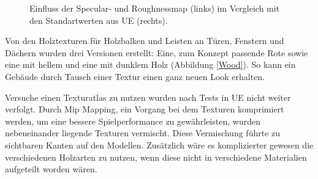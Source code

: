 \begin{figure}[H]
\centering
  \caption{Einfluss der Specular- und Roughnessmap (links) im Vergleich mit den Standartwerten aus UE (rechts).}
	\label{specroughvs}
\end{figure}
\vspace{-10.5pt}
Von den Holztexturen für Holzbalken und Leisten an Türen, Fenstern und Dächern wurden drei Versionen erstellt: Eine, zum Konzept passende Rote sowie eine mit hellem und eine mit dunklem Holz (Abbildung \ref{Wood}). So kann ein Gebäude durch Tausch einer Textur einen ganz neuen Look erhalten.
\par
Versuche einen Texturatlas zu nutzen wurden nach Tests in UE nicht weiter verfolgt. Durch Mip Mapping, ein Vorgang bei dem Texturen komprimiert werden, um eine bessere Spielperformance zu gewährleisten, wurden nebeneinander liegende Texturen vermischt. Diese Vermischung führte zu sichtbaren Kanten auf den Modellen. Zusätzlich wäre es komplizierter gewesen die verschiedenen Holzarten zu nutzen, wenn diese nicht in verschiedene Materialien aufgeteilt worden wären.

